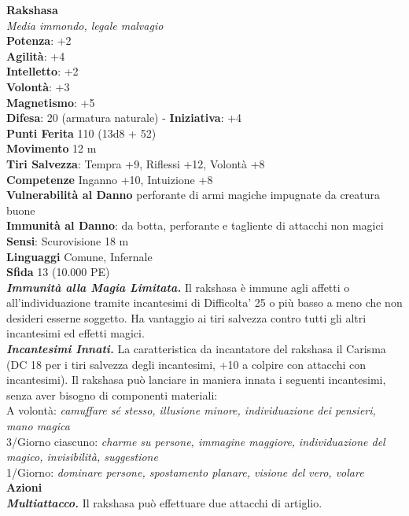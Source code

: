 \begin{multicols}{2}
\medskip\textbf{Rakshasa}\\
\emph{Media immondo, legale malvagio}\\
\textbf{Potenza}: +2\\
\textbf{Agilità}: +4\\
\textbf{Intelletto}: +2\\
\textbf{Volontà}: +3\\
\textbf{Magnetismo}: +5\\
\textbf{Difesa}: 20 (armatura naturale) - \textbf{Iniziativa}: +4\\
\textbf{Punti Ferita} 110 (13d8 + 52)\\
\textbf{Movimento} 12 m\\
\textbf{Tiri Salvezza}: Tempra +9, Riflessi +12, Volontà +8 \\
\textbf{Competenze} Inganno +10, Intuizione +8\\
\textbf{Vulnerabilità al Danno} perforante di armi magiche impugnate da creatura buone\\
\textbf{Immunità al Danno}: da botta, perforante e tagliente di attacchi non magici\\
\textbf{Sensi}: Scurovisione 18 m\\
\textbf{Linguaggi} Comune, Infernale\\
\textbf{Sfida} 13 (10.000 PE)\smallskip\\
\emph{\textbf{Immunità alla Magia Limitata.}} Il rakshasa è immune agli affetti o all'individuazione tramite incantesimi di Difficolta' 25 o più basso a meno che non desideri esserne soggetto. Ha vantaggio ai tiri salvezza contro tutti gli altri incantesimi ed effetti magici.\\
\emph{\textbf{Incantesimi Innati.}} La caratteristica da incantatore del rakshasa il Carisma (DC 18 per i tiri salvezza degli incantesimi, +10 a colpire  con attacchi con incantesimi). Il rakshasa può lanciare in maniera  innata i seguenti incantesimi, senza aver bisogno di componenti  materiali:\\
A volontà: \emph{camuffare sé stesso, illusione minore, individuazione} \emph{dei pensieri, mano magica}\\
3/Giorno ciascuno: \emph{charme su persone, immagine maggiore,} \emph{individuazione del magico, invisibilità, suggestione}\\
1/Giorno: \emph{dominare persone, spostamento planare, visione del} \emph{vero, volare}\\
\smallskip\textbf{Azioni}\\
\emph{\textbf{Multiattacco.}} Il rakshasa può effettuare due attacchi di artiglio.\\

\end{multicols}
